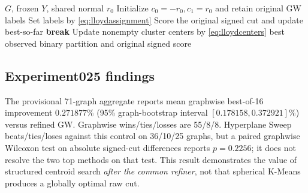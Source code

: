 \begin{algorithm}[tb]
\caption{Paired spherical K-MeansNM}\label{alg:paired}
\begin{algorithmic}[1]
\Require $G$, frozen $Y$, shared normal $r_0$
\State Initialize $c_0=-r_0,c_1=r_0$ and retain original GW labels
 \State Set labels by \eqref{eq:lloydassignment}
 \State Score the original signed cut and update best-so-far
 \State\textbf{break}\EndIf
 \State Update nonempty cluster centers by \eqref{eq:lloydcenters}
\EndFor
\State \Return best observed binary partition and original signed score
\end{algorithmic}
\end{algorithm}

\subsection{Experiment025 findings}
The provisional 71-graph aggregate reports mean graphwise best-of-16 improvement $0.271877\%$ (95\% graph-bootstrap interval $[0.178158,0.372921]\%$) versus refined GW. Graphwise wins/ties/losses are 55/8/8. Hyperplane Sweep beats/ties/loses against this control on 36/10/25 graphs, but a paired graphwise Wilcoxon test on absolute signed-cut differences reports $p=0.2256$; it does not resolve the two top methods on that test. This result demonstrates the value of structured centroid search \emph{after the common refiner}, not that spherical K-Means produces a globally optimal raw cut.